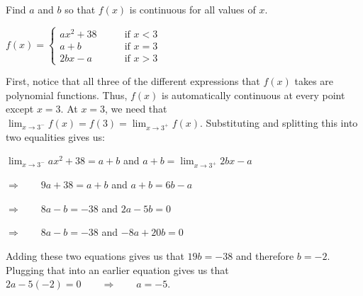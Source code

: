 \documentclass[handout,nooutcomes]{ximera}
\begin{document}
\begin{problem}
Find $a$ and $b$ so that $f(x)$ is continuous for all values of $x$.
	
	$f(x) =   \left\{ \begin{array}{ll}
	ax^2 + 38		 	&	\qquad \text{if } x < 3	\\
	a + b 				&	\qquad \text{if } x = 3	\\
	2bx - a			&	\qquad \text{if } x > 3	\end{array} \right.  $

	\begin{freeResponse}
	
	First, notice that all three of the different expressions that $f(x)$ takes are polynomial functions.  Thus, $f(x)$ is automatically continuous at every point except $x = 3$.  At $x = 3$, we need that $\lim_{x \to 3^-} f(x) = f(3) = \lim_{x \to 3^+} f(x)$.  Substituting and splitting this into two equalities gives us:
	
	$\lim_{x \to 3^-} ax^2 + 38 = a + b$ \qquad and \qquad $a + b = \lim_{x \to 3^+} 2bx-a$
	
	$ \Longrightarrow \qquad 9a + 38 = a + b$ \qquad and \qquad $a + b = 6b - a$
	
	$ \Longrightarrow \qquad 8a - b = -38$ \qquad and \qquad $2a - 5b = 0$
	
	$ \Longrightarrow \qquad 8a - b = -38$ \qquad and \qquad $-8a + 20b = 0$
	
	Adding these two equations gives us that $19b = -38$ and therefore $b = -2$.  Plugging that into an earlier equation gives us that $2a - 5(-2) = 0 \qquad \Longrightarrow \qquad a = -5$.  
	
	\end{freeResponse}
\end{problem}
	
	
	
	
	
	
	
	
	
\end{document}
